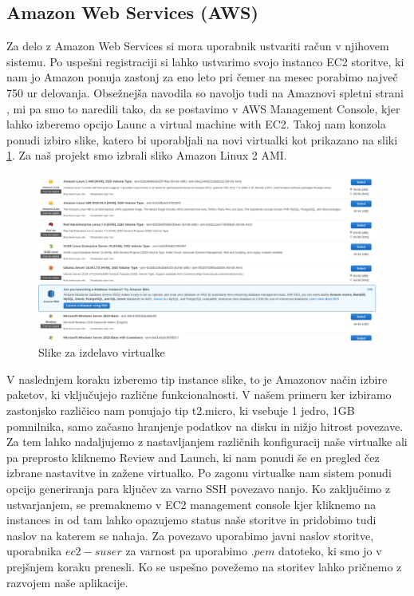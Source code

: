 \subsection{Amazon Web Services (AWS)}
Za delo z Amazon Web Services si mora uporabnik ustvariti račun v njihovem sistemu. Po uspešni registraciji si lahko ustvarimo svojo instanco EC2 storitve, ki nam jo Amazon ponuja zastonj za eno leto pri čemer na mesec porabimo največ 750 ur delovanja. Obsežnejša navodila so navoljo tudi na Amaznovi spletni strani \cite{1_aws_ec2_tutorial}, mi pa smo to naredili tako, da se postavimo v AWS Management Console, kjer lahko izberemo opcijo Launc a virtual machine with EC2. Takoj nam konzola ponudi izbiro slike, katero bi uporabljali na novi virtualki kot prikazano na sliki \ref{fig:1_AWS_images}. Za naš projekt smo izbrali sliko Amazon Linux 2 AMI. 
\begin{figure}[H]
    \centering
    \includegraphics[scale=0.25]{Img/1_AWS_images.png}
    \caption{Slike za izdelavo virtualke}
    \label{fig:1_AWS_images}
\end{figure}
V naslednjem koraku izberemo tip instance slike, to je Amazonov način izbire paketov, ki vključujejo različne funkcionalnosti. V našem primeru ker izbiramo zastonjsko različico nam ponujajo tip t2.micro, ki vsebuje 1 jedro, 1GB pomnilnika, samo začasno hranjenje podatkov na disku in nižjo hitrost povezave. Za tem lahko nadaljujemo z nastavljanjem različnih konfiguracij naše virtualke ali pa preprosto kliknemo Review and Launch, ki nam ponudi še en pregled čez izbrane nastavitve in zažene virtualko.  Po zagonu virtualke nam sistem ponudi opcijo generiranja para ključev za varno SSH povezavo nanjo. Ko zaključimo z ustvarjanjem, se premaknemo v EC2 management console kjer kliknemo na instances in od tam lahko opazujemo status naše storitve in pridobimo tudi naslov na katerem se nahaja. Za povezavo uporabimo javni naslov storitve, uporabnika $ec2-suser$ za varnost pa uporabimo $.pem$ datoteko, ki smo jo v prejšnjem koraku prenesli. Ko se uspešno povežemo na storitev lahko pričnemo z razvojem naše aplikacije.

